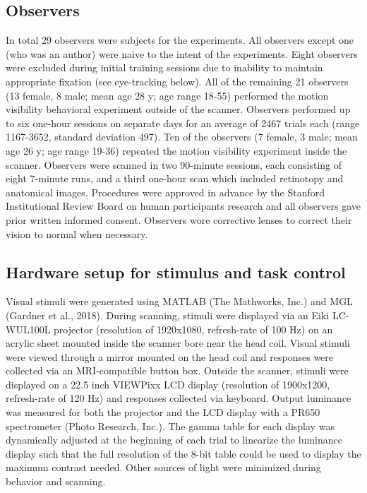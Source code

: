 \documentclass{report}
\begin{document}
\subsection{Observers}
In total 29 observers were subjects for the experiments. All observers except one (who was an author) were naive to the intent of the experiments. Eight observers were excluded during initial training sessions due to inability to maintain appropriate fixation (see eye-tracking below). All of the remaining 21 observers (13 female, 8 male; mean age 28 y; age range 18-55) performed the motion visibility behavioral experiment outside of the scanner. Observers performed up to six one-hour sessions on separate days for an average of 2467 trials each (range 1167-3652, standard deviation 497). Ten of the observers (7 female, 3 male; mean age 26 y; age range 19-36) repeated the motion visibility experiment inside the scanner. Observers were scanned in two 90-minute sessions, each consisting of eight 7-minute runs, and a third one-hour scan which included retinotopy and anatomical images. Procedures were approved in advance by the Stanford Institutional Review Board on human participants research and all observers gave prior written informed consent. Observers wore corrective lenses to correct their vision to normal when necessary.

\subsection{Hardware setup for stimulus and task control}

Visual stimuli were generated using MATLAB (The Mathworks, Inc.) and MGL (Gardner et al., 2018). During scanning, stimuli were displayed via an Eiki LC-WUL100L projector (resolution of 1920x1080, refresh-rate of 100 Hz) on an acrylic sheet mounted inside the scanner bore near the head coil. Visual stimuli were viewed through a mirror mounted on the head coil and responses were collected via an MRI-compatible button box. Outside the scanner, stimuli were displayed on a 22.5 inch VIEWPixx LCD display (resolution of 1900x1200, refresh-rate of 120 Hz) and responses collected via keyboard. Output luminance was measured for both the projector and the LCD display with a PR650 spectrometer (Photo Research, Inc.). The gamma table for each display was dynamically adjusted at the beginning of each trial to linearize the luminance display such that the full resolution of the 8-bit table could be used to display the maximum contrast needed. Other sources of light were minimized during behavior and scanning.
\end{document}
